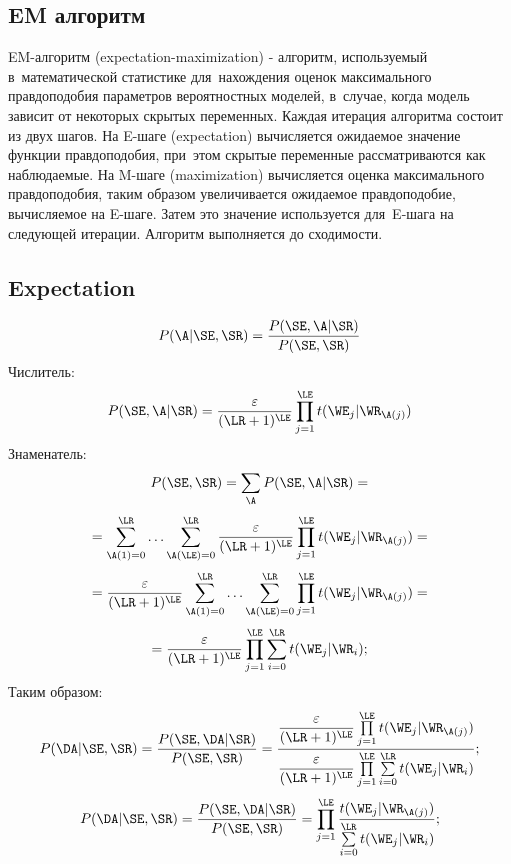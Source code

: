 

\subsection{EM алгоритм}

EM-алгоритм (expectation-maximization) - алгоритм, используемый в~математической 
статистике для~нахождения оценок максимального правдоподобия параметров вероятностных моделей, 
в~случае, когда модель зависит от некоторых скрытых переменных. 
Каждая итерация алгоритма состоит из двух шагов. 
На E-шаге (expectation) вычисляется ожидаемое значение функции правдоподобия, 
при~этом скрытые переменные рассматриваются как наблюдаемые. 
На M-шаге (maximization) вычисляется оценка максимального правдоподобия, 
таким образом увеличивается ожидаемое правдоподобие, 
вычисляемое на E-шаге. Затем это значение используется для~E-шага 
на следующей итерации. Алгоритм выполняется до сходимости. 

\subsection*{Expectation}

\[
	P(\A | \SE, \SR) = \dfrac{P(\SE, \A| \SR)}
			{P(\SE, \SR)}
\]
Числитель:
\[
	P(\SE, \A| \SR)	= \dfrac{\varepsilon}{(\LR + 1)^{\LE}} \prod\limits_{j = 1}^{\LE} t(\WE_{j} | \WR_{\A(j)}) 
\]
Знаменатель:
\[
	P(\SE, \SR) = \sum\limits_{\A} P(\SE, \A| \SR) = 
\]\[
	= \sum\limits_{\A(1) = 0 }^{\LR} \ldots \sum\limits_{\A(\LE) = 0 }^{\LR}
		\dfrac{\varepsilon}{(\LR + 1)^{\LE}} 
			\prod\limits_{j = 1}^{\LE} t(\WE_{j} | \WR_{\A(j)}) = 
\]\[
	= 	\dfrac{\varepsilon}{(\LR + 1)^{\LE}}
			\sum\limits_{\A(1) = 0 }^{\LR} \ldots \sum\limits_{\A(\LE) = 0 }^{\LR} 
				\prod\limits_{j = 1}^{\LE} t(\WE_{j} | \WR_{\A(j)}) = 
\]\[
	= 	\dfrac{\varepsilon}{(\LR + 1)^{\LE}}
			\prod\limits_{j = 1}^{\LE} 
				\sum\limits_{i = 0 }^{\LR}
					t(\WE_{j} | \WR_{i}); 
\]
Таким образом:
\[
	P(\DA | \SE, \SR) = \dfrac{P(\SE, \DA| \SR)}{P(\SE, \SR)} = 	
		\dfrac
			{
				\dfrac{\varepsilon}{(\LR + 1)^{\LE}} 
					\prod\limits_{j = 1}^{\LE} t(\WE_{j} | \WR_{\A(j)})
			}
			{
				\dfrac{\varepsilon}{(\LR + 1)^{\LE}}
					\prod\limits_{j = 1}^{\LE} 
						\sum\limits_{i = 0 }^{\LR}
							t(\WE_{j} | \WR_{i})
			};
\]\[
	P(\DA | \SE, \SR) = \dfrac{P(\SE, \DA| \SR)}{P(\SE, \SR)} = 	
			\prod\limits_{j = 1}^{\LE} 
				\dfrac{t(\WE_{j} | \WR_{\A(j)})}		
					{\sum\limits_{i = 0 }^{\LR} t(\WE_{j} | \WR_{i})};
\]

